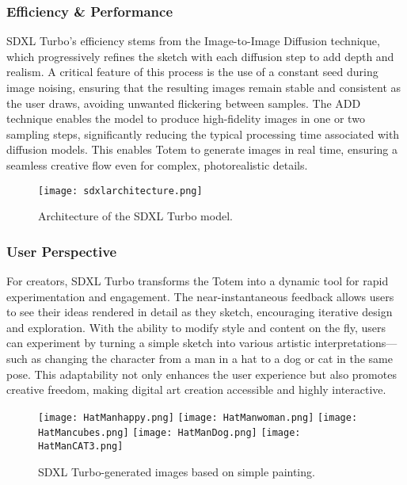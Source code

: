 \subsubsection{Efficiency & Performance}
SDXL Turbo’s efficiency stems from the Image-to-Image Diffusion technique, which progressively refines the sketch with each diffusion step to add depth and realism.
A critical feature of this process is the use of a constant seed during image noising, ensuring that the resulting images remain stable and consistent as the user draws, avoiding unwanted flickering between samples.
The ADD technique enables the model to produce high-fidelity images in one or two sampling steps, significantly reducing the typical processing time associated with diffusion models.
This enables Totem to generate images in real time, ensuring a seamless creative flow even for complex, photorealistic details.

\begin{figure}[h]
    \centering
    \texttt{[image: sdxlarchitecture.png]}
    \caption{Architecture of the SDXL Turbo model.}
    \vspace{0.1cm}
    \label{fig:sdxlarchitecture}
\end{figure}

\subsubsection{User Perspective}
For creators, SDXL Turbo transforms the Totem into a dynamic tool for rapid experimentation and engagement.
The near-instantaneous feedback allows users to see their ideas rendered in detail as they sketch, encouraging iterative design and exploration.
With the ability to modify style and content on the fly, users can experiment by turning a simple sketch into various artistic interpretations—such as changing the character from a man in a hat to a dog or cat in the same pose.
This adaptability not only enhances the user experience but also promotes creative freedom, making digital art creation accessible and highly interactive.

\begin{figure}[h!]
    \centering
    \texttt{[image: HatManhappy.png]}
    \texttt{[image: HatManwoman.png]}
    \texttt{[image: HatMancubes.png]}
    \texttt{[image: HatManDog.png]}
    \texttt{[image: HatManCAT3.png]}
    \caption{SDXL Turbo-generated images based on simple painting.}
    \vspace{0.1cm}
    \label{fig:sdxlpainting}
\end{figure}

